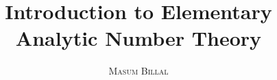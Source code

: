 \documentclass[12pt,leqno]{book}
\title{\bfseries Introduction to Elementary Analytic Number Theory}
\author{\scshape Masum Billal}
\theoremstyle{definition}
\begin{document}
    \frontmatter
    
    \maketitle
    \tableofcontents
    
    \printnomenclature
    \mainmatter
    \begin{refsection}
    \end{refsection}

	\begin{refsection}
		
        
    \end{refsection}

	\begin{refsection}
		
	\end{refsection}
    \backmatter
    \printglossary[type=\acronymtype,title={List of Acronyms}]
    \printglossary[title=Glossary]
    \printindex
\end{document}
